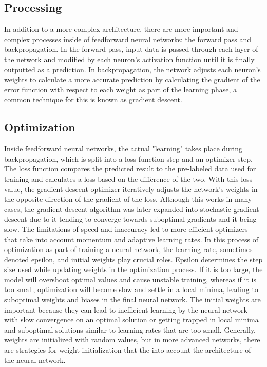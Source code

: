 \documentclass[12pt, letter]{article}
\begin{document}
\subsection{Processing}

In addition to a more complex architecture, there are more important and complex processes inside of feedforward neural networks: the forward pass and backpropagation. In the forward pass, input data is passed through each layer of the network and modified by each neuron’s activation function until it is finally outputted as a prediction. In backpropagation, the network adjusts each neuron's weights to calculate a more accurate prediction by calculating the gradient of the error function with respect to each weight as part of the learning phase, a common technique for this is known as gradient descent. 


\subsection{Optimization}

Inside feedforward neural networks, the actual "learning" takes place during backpropagation, which is split into a loss function step and an optimizer step. The loss function compares the predicted result to the pre-labeled data used for training and calculates a loss based on the difference of the two. With this loss value, the gradient descent optimizer iteratively adjusts the network's weights in the opposite direction of the gradient of the loss. Although this works in many cases, the gradient descent algorithm was later expanded into stochastic gradient descent due to it tending to converge towards suboptimal gradients and it being slow. The limitations of speed and inaccuracy led to more efficient optimizers that take into account momentum and adaptive learning rates. In this process of optimization as part of training a neural network, the learning rate, sometimes denoted epsilon, and initial weights play crucial roles. Epsilon determines the step size used while updating weights in the optimization process. If it is too large, the model will overshoot optimal values and cause unstable training, whereas if it is too small, optimization will become slow and settle in a local minima, leading to suboptimal weights and biases in the final neural network. The initial weights are important because they can lead to inefficient learning by the neural network with slow convergence on an optimal solution or getting trapped in local minima and suboptimal solutions similar to learning rates that are too small. Generally, weights are initialized with random values, but in more advanced networks, there are strategies for weight initialization that the into account the architecture of the neural network. 
\end{document}
